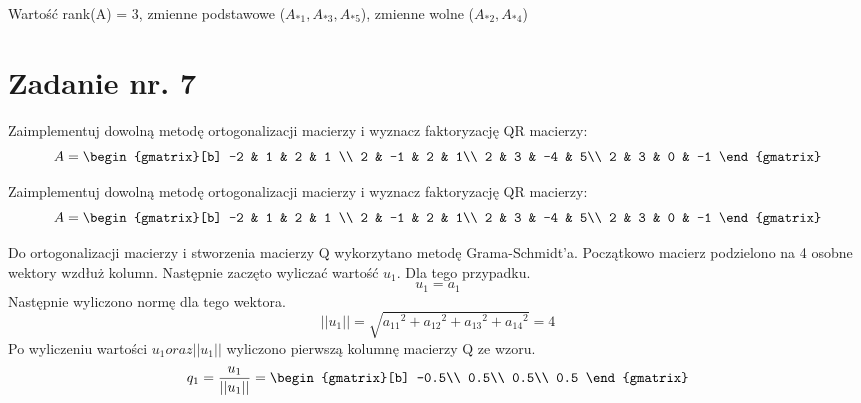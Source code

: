 \documentclass{article}
\begin{document}
Wartość rank(A) = 3, zmienne podstawowe ($A_{*1},A_{*3},A_{*5}$), zmienne wolne ($A_{*2},A_{*4}$)\\

\section{Zadanie nr. 7}
Zaimplementuj dowolną metodę ortogonalizacji macierzy i wyznacz faktoryzację
QR macierzy:
\begin{equation}
  A=
  \begin{gmatrix}[b]
  -2 & 1 & 2 & 1 \\
  2 & -1 & 2 & 1\\
  2 & 3 & -4 & 5\\
  2 & 3 & 0 & -1 
\end{gmatrix}
\end{equation}

Zaimplementuj dowolną metodę ortogonalizacji macierzy i wyznacz faktoryzację
QR macierzy:
\begin{equation}
  A=
  \begin{gmatrix}[b]
  -2 & 1 & 2 & 1 \\
  2 & -1 & 2 & 1\\
  2 & 3 & -4 & 5\\
  2 & 3 & 0 & -1 
\end{gmatrix}
\end{equation}

Do ortogonalizacji macierzy i stworzenia macierzy Q wykorzytano metodę Grama-Schmidt'a. Początkowo macierz podzielono na 4 osobne wektory wzdłuż kolumn.
Następnie zaczęto wyliczać wartość $u_{1}$. Dla tego przypadku.
\begin{equation}
  u_{1}=a_{1}
\end{equation}
Następnie wyliczono normę dla tego wektora.
\begin{equation}
  ||u_{1}|| = \sqrt{{a_{11}}^2+{a_{12}}^2+{a_{13}}^2+{a_{14}}^2}=4
\end{equation}
Po wyliczeniu wartości $u_{1} oraz ||u_{1}||$ wyliczono pierwszą kolumnę macierzy Q ze wzoru.
\begin{equation}
  q_{1}=\frac{u_{1}}{||u_{1}||} =
  \begin{gmatrix}[b]
    -0.5\\
    0.5\\
    0.5\\
    0.5
  \end{gmatrix}
\end{equation}
\end{document}
